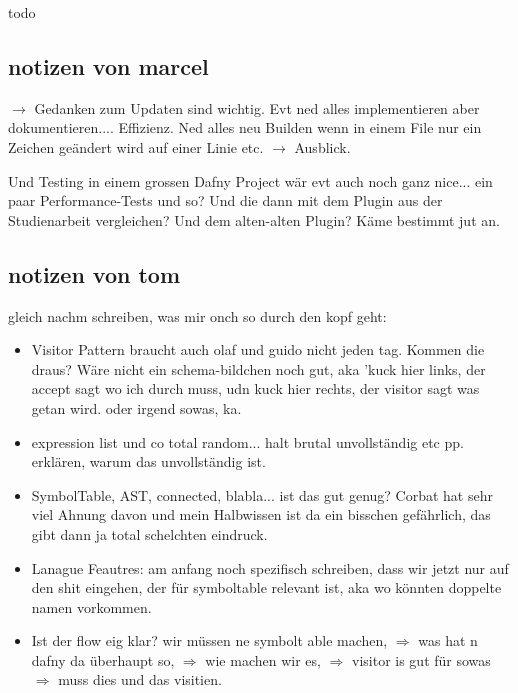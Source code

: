 todo


\subsection{notizen von marcel}

$\rightarrow$ Gedanken zum Updaten sind wichtig. Evt ned alles implementieren aber dokumentieren.... Effizienz. Ned alles neu Builden
wenn in einem File nur ein Zeichen geändert wird auf einer Linie etc. $\rightarrow$ Ausblick.

Und Testing in einem grossen Dafny Project wär evt auch noch ganz nice... ein paar Performance-Tests und so?
Und die dann mit dem Plugin aus der Studienarbeit vergleichen? Und dem alten-alten Plugin? Käme bestimmt jut an.


\subsection{notizen von tom}
gleich nachm schreiben, was mir onch so durch den kopf geht:
\begin{itemize}
    \item Visitor Pattern braucht auch olaf und guido nicht jeden tag. Kommen die draus? Wäre nicht ein schema-bildchen noch gut, aka 'kuck hier links, der accept sagt wo ich durch muss, udn kuck hier rechts, der visitor sagt was getan wird. oder irgend sowas, ka.
    \item expression list und co total random... halt brutal unvollständig etc pp. erklären, warum das unvollständig ist.
    \item SymbolTable, AST, connected, blabla... ist das gut genug? Corbat hat sehr viel Ahnung davon und mein Halbwissen ist da ein bisschen gefährlich, das gibt dann ja total schelchten eindruck.
    \item Lanague Feautres: am anfang noch spezifisch schreiben, dass wir jetzt nur auf den shit eingehen, der für symboltable relevant ist, aka wo könnten doppelte namen vorkommen.
    \item Ist der flow eig klar? wir müssen ne symbolt able machen, $\Rightarrow$ was hat n dafny da überhaupt so, $\Rightarrow$ wie machen wir es, $\Rightarrow$ visitor is gut für sowas $\Rightarrow$ muss dies und das visitien.
\end{itemize}
